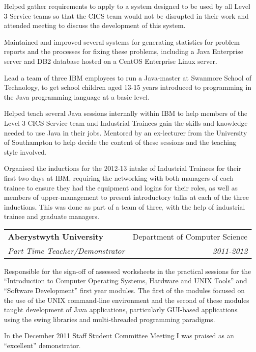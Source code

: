 \documentclass[letterpaper,11pt]{article}
\makeatletter
\newcommand{\ressubheading}[4]{
\begin{tabular*}{6.5in}{l@{\cftdotfill{\cftsecdotsep}\extracolsep{\fill}}r}
		\textbf{#1} & #2 \\
		\textit{#3} & \textit{#4} \\
\end{tabular*}\vspace{-6pt}}
\makeatother
\begin{document}
Helped gather requirements to apply to a system designed to be used by all 
Level 3 Service teams so that the CICS team would not be disrupted in their 
work and attended meeting to discuss the development of this system.

Maintained and improved several systems for generating statistics for problem 
reports and the processes for fixing these problems, including a Java 
Enterprise server and DB2 database hosted on a CentOS Enterprise Linux server.

Lead a team of three IBM employees to run a Java-master at Swanmore School of 
Technology, to get school children aged 13-15 years introduced to programming 
in the Java programming language at a basic level.

Helped teach several Java sessions internally within IBM to help members of the
Level 3 CICS Service team and Industrial Trainees gain the skills and knowledge
needed to use Java in their jobs. Mentored by an ex-lecturer from the 
University of Southampton to help decide the content of these sessions and the 
teaching style involved.

Organised the inductions for the 2012-13 intake of Industrial Trainees for 
their first two days at IBM, requiring the networking with both managers of 
each trainee to ensure they had the equipment and logins for their roles, as 
well as members of upper-management to present introductory talks at each of 
the three inductions. This was done as part of a team of three, with the help 
of industrial trainee and graduate managers.



\vspace{10pt}
\ressubheading{Aberystwyth University}{Department of Computer Science}{Part 
Time Teacher/Demonstrator}{2011-2012}
\vspace{10pt}

Responsible for the sign-off of assessed worksheets in the practical sessions 
for the ``Introduction to Computer Operating Systems, Hardware and UNIX Tools''
and ``Software Development'' first year modules. The first of the modules 
focused on the use of the UNIX command-line environment and the second of these
modules taught development of Java applications, particularly GUI-based 
applications using the swing libraries and multi-threaded programming 
paradigms.

In the December 2011 Staff Student Committee Meeting I was praised as an 
``excellent'' demonstrator.
\end{document}
